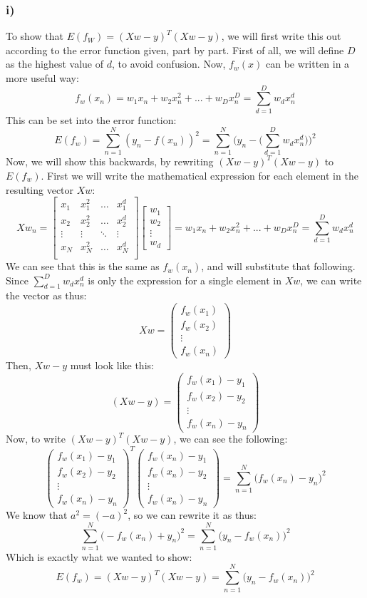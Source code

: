 \subsubsection{i)}
To show that $E(f_W)=(Xw-y)^T(Xw-y)$, we will first write this out according to the error function given, part by part. First of all, we will define $D$ as the highest value of $d$, to avoid confusion. Now, $f_w(x)$ can be written in a more useful way:
$$
f_w(x_n) = w_1x_n+w_2x_n^2+...+w_Dx_n^D = \sum_{d=1}^D w_d x_n^d
$$
This can be set into the error function:
$$
E(f_w) = \sum_{n=1}^N (y_n-f(x_n))^2 = \sum_{n=1}^N \Big(y_n-\Big(\sum_{d=1}^D w_d x_n^d\Big)\Big)^2
$$
Now, we will show this backwards, by rewriting $(Xw-y)^T(Xw-y)$ to $E(f_w)$. First we will write the mathematical expression for each element in the resulting vector $Xw$:
$$
Xw_n =
\left[
\begin{array}{llll}
x_1    & x_1^2  & \dots  & x_1^d  \\
x_2    & x_2^2  & \dots  & x_2^d  \\
\vdots & \vdots & \ddots & \vdots \\
x_N    & x_N^2  & \dots  & x_N^d  \\
\end{array}
\right]
\left[
\begin{array}{l}
w_1\\
w_2\\
\vdots\\
w_d
\end{array}
\right]
=
w_1x_n+w_2x_n^2+...+w_Dx_n^D = \sum_{d=1}^D w_d x_n^d
$$
We can see that this is the same as $f_w(x_n)$, and will substitute that following. Since $\sum_{d=1}^D w_d x_n^d$ is only the expression for a single element in $Xw$, we can write the vector as thus:
$$
Xw = 
\left(
\begin{array}{l}
f_w(x_1) \\
f_w(x_2) \\
\vdots \\
f_w(x_n)
\end{array}
\right)
$$
Then, $Xw-y$ must look like this:
$$
(Xw-y)= 
\left(
\begin{array}{l}
f_w(x_1)-y_1 \\
f_w(x_2)-y_2 \\
\vdots \\
f_w(x_n)-y_n
\end{array}
\right)
$$
Now, to write $(Xw-y)^T(Xw-y)$, we can see the following:
$$
\left(
\begin{array}{l}
f_w(x_1)-y_1 \\
f_w(x_2)-y_2 \\
\vdots \\
f_w(x_n)-y_n
\end{array}
\right)^T
\left(
\begin{array}{l}
f_w(x_n)-y_1 \\
f_w(x_n)-y_2 \\
\vdots \\
f_w(x_n)-y_n
\end{array}
\right)
= \sum_{n=1}^N\Big(f_w(x_n)-y_n\Big)^2
$$
We know that $a^2 = (-a)^2$, so we can rewrite it as thus:
$$
\sum_{n=1}^N\Big(-f_w(x_n)+y_n\Big)^2 = \sum_{n=1}^N\Big(y_n-f_w(x_n)\Big)^2
$$
Which is exactly what we wanted to show:
$$
E(f_w) = (Xw-y)^T(Xw-y) = \sum_{n=1}^N\Big(y_n-f_w(x_n)\Big)^2
$$
